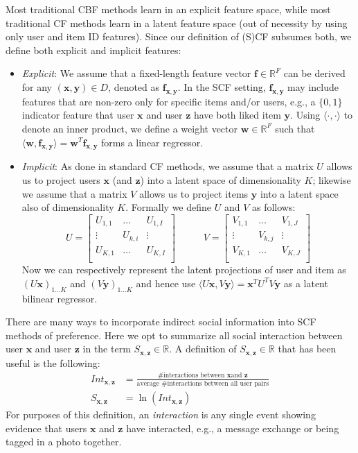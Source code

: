 \documentclass{sig-alternate}
\newcommand{\R}{\mathbb{R}}
\newcommand{\x}{\vec{x}}
\newcommand{\y}{\vec{y}}
\newcommand{\z}{\vec{z}}
\newcommand{\w}{\vec{w}}
\newcommand{\f}{\vec{f}}
\newcommand{\la}{\langle}
\newcommand{\ra}{\rangle}
\renewcommand{\vec}[1]{\mathbf{#1}}
\begin{document}
Most traditional CBF methods learn in an explicit
feature space, while most traditional CF methods learn in a
latent feature space (out of necessity by using only user and item ID
features).  Since our definition of (S)CF subsumes both, we define 
both explicit and implicit features:
\begin{itemize}
\item {\it Explicit}: We assume that a fixed-length feature vector
$\f \in \mathbb{R}^F$ can be derived for any $(\x,\y) \in D$, denoted
as $\f_{\x,\y}$.  In the SCF setting, $\f_{\x,\y}$ may include features
that are non-zero only for specific items and/or users, e.g., a $\{0,1\}$ 
indicator feature that user $\x$
and user $\z$ have both liked item $\y$.  Using
$\la \cdot,\cdot \ra$ to 
denote an inner product, we define a weight
vector $\w \in \R^F$ such that $\la \w, \f_{\x,\y} \ra = \w^T \f_{\x,\y}$ forms 
a linear regressor.
\item {\it Implicit}: As done in standard CF methods, we assume that
a matrix $U$ allows us to project users $\x$ (and $\z$)
into a latent space of dimensionality $K$; likewise we assume that
a matrix $V$ allows us to project items $\y$ into a latent
space also of dimensionality $K$.  Formally we define $U$ and $V$
as follows:
\begin{equation*}
U = 
\begin{bmatrix}
  U_{1,1} & \hdots  & U_{1,I} \\
  \vdots  & U_{k,i} & \vdots  \\
  U_{K,1} & \hdots  & U_{K,I} \\
\end{bmatrix}
\qquad \; \; \;
V = 
\begin{bmatrix}
  V_{1,1} & \hdots  & V_{1,J} \\
  \vdots  & V_{k,j} & \vdots  \\
  V_{K,1} & \hdots  & V_{K,J} \\
\end{bmatrix}
\end{equation*}
Now we can respectively represent the latent projections of user and
item as $(U \x)_{1 \ldots K}$ and $(V \y)_{1 \ldots K}$ and
hence use $\la U \x, V \y \ra = \x^T U^T V \y$ as a latent bilinear regressor.
\end{itemize}

There are many ways to incorporate indirect social information into
SCF methods of preference.  Here we opt to summarize all social
interaction between user $\x$ and user $\z$ in the term $S_{\x,\z} \in
\R$.  A definition of $S_{\x,\z} \in \R$ that has been useful is the
following:
\begin{align}
\mathit{Int}_{\x,\z} & = \frac{\mbox{\# interactions between $\x$
and $\z$}}{\mbox{average \# interactions between all user pairs}}\\
S_{\x,\z} & = \ln \left( \mathit{Int}_{\x,\z} \right)
\end{align}
For purposes of this definition, an \emph{interaction} is any single event
showing evidence that users $\x$ and $\z$ have 
interacted, e.g., a message exchange or being tagged in a photo together.
\end{document}
